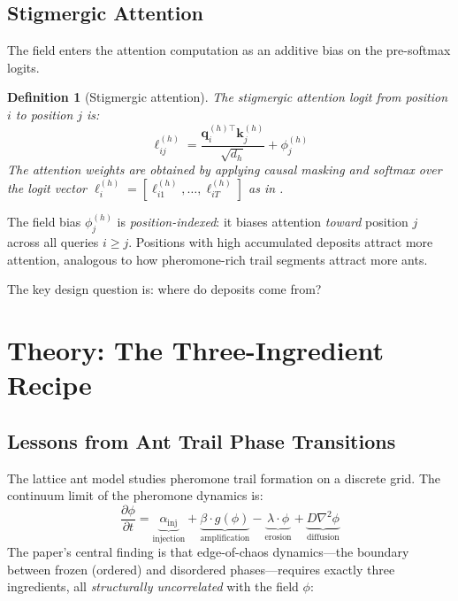 \documentclass[11pt,a4paper]{article}
\newtheorem{definition}{Definition}
\newcommand{\q}{\bm{q}}
\newcommand{\K}{\bm{k}}
\begin{document}
\subsection{Stigmergic Attention}

The field enters the attention computation as an additive bias on the
pre-softmax logits.

\begin{definition}[Stigmergic attention]
\label{def:stigmergic}
The stigmergic attention logit from position $i$ to position $j$ is:
\begin{equation}
    \ell_{ij}^{(h)} = \frac{\q_i^{(h)\top} \K_j^{(h)}}{\sqrt{d_h}} + \phi_j^{(h)}
    \label{eq:stigmergic_logit}
\end{equation}
The attention weights are obtained by applying causal masking and softmax
over the logit vector $\bm{\ell}_i^{(h)} = [\ell_{i1}^{(h)}, \ldots, \ell_{iT}^{(h)}]$
as in .
\end{definition}

The field bias $\phi_j^{(h)}$ is \emph{position-indexed}: it biases
attention \emph{toward} position $j$ across all queries $i \geq j$.
Positions with high accumulated deposits attract more attention,
analogous to how pheromone-rich trail segments attract more ants.

The key design question is: where do deposits come from?


\section{Theory: The Three-Ingredient Recipe}
\label{sec:theory}

\subsection{Lessons from Ant Trail Phase Transitions}

The lattice ant model \cite{antpaper} studies pheromone trail formation
on a discrete grid. The continuum limit of the pheromone dynamics is:
\begin{equation}
    \frac{\partial \phi}{\partial t}
    = \underbrace{\alpha_{\text{inj}}}_{\text{injection}}
    + \underbrace{\beta \cdot g(\phi)}_{\text{amplification}}
    - \underbrace{\lambda \cdot \phi}_{\text{erosion}}
    + \underbrace{D \nabla^2 \phi}_{\text{diffusion}}
    \label{eq:ant_pde}
\end{equation}
The paper's central finding is that edge-of-chaos dynamics---the boundary
between frozen (ordered) and disordered phases---requires exactly three
ingredients, all \emph{structurally uncorrelated} with the field $\phi$:
\end{document}
